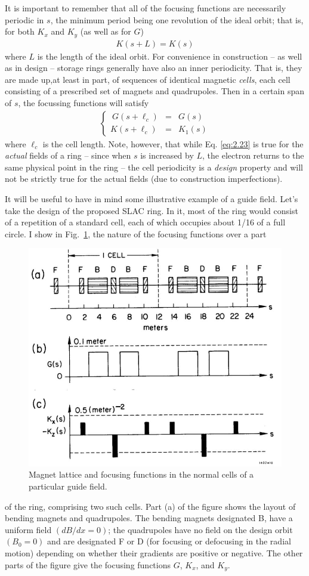 It is important to remember that all of the focusing functions are necessarily periodic in $s$, the minimum period being one revolution of the ideal orbit; that is, for both $K_x$ and $K_y$ (as well as for $G$)
\begin{align}
	K(s+L) = K(s)\label{eq:2.23}
\end{align}
where $L$ is the length of the ideal orbit. For convenience in construction -- as well as in design -- storage rings generally have also an inner periodicity. That is, they are made up,at least in part, of sequences of identical magnetic \textit{cells},
each cell consisting of a prescribed set of magnets and quadrupoles. Then in a certain span of $s$, the focussing functions will satisfy
\begin{align}
	\left\{\begin{array}{rcl}
	\ G(s+\ell_c) & = & G(s)\\
	K(s+\ell_c) & = & K_1(s)
	\end{array}\right.
\end{align}
where $\ell_c$ is the cell length. Note, however, that while Eq. \eqref{eq:2.23} is true for the \textit{actual} fields of a ring -- since when $s$ is increased by $L$, the electron returns to the same physical point in the ring -- the cell periodicity is a \textit{design} property and will not be strictly true for the actual fields (due to construction imperfections).

It will be useful to have in mind some illustrative example of a guide field. Let’s take the design of the proposed SLAC ring. In it, most of the ring would consist of a repetition of a standard cell, each of which occupies about 1/16 of a full circle. I show in Fig.~\ref{fig:fig10}, the nature of the focusing functions over a part

\begin{figure}[!htb]
	\centering
	\includegraphics[width=0.7\linewidth]{./Figuras/fig10.jpeg}
	\caption{Magnet lattice and focusing functions in the normal cells
	of a particular guide field.}
	\label{fig:fig10}
\end{figure}
of the ring, comprising two such cells. Part (a) of the figure shows the layout of bending magnets and quadrupoles. The bending magnets designated B, have a uniform field $(dB/dx = 0)$; the quadrupoles have no field on the design orbit $(B_0=0)$ and are designated F or D (for focusing or defocusing in the radial motion) depending on whether their gradients are positive or negative. The other parts of the figure give the focusing functions $G$, $K_x$, and $K_y$.
